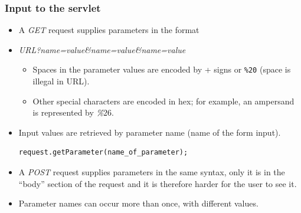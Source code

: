 \documentclass[10pt,xcolor=pdflatex]{beamer}
\begin{document}
\begin{frame}[containsverbatim]\frametitle{Input to the servlet}
\begin{itemize}
	\item A \emph{GET} request supplies parameters in the format
    \item[] \begin{footnotesize} \emph{URL?name=value\&name=value\&name=value} \end{footnotesize}
      \begin{itemize}
		\item Spaces in the parameter values are encoded by + signs or \texttt{\%20} (space is illegal in URL).
		\item Other special characters are encoded in hex; for example, an ampersand is represented by \emph{\%\texttt{$26$}}.
      \end{itemize}
    \item Input values are retrieved by parameter name (name of the form input). \begin{verbatim} 
request.getParameter(name_of_parameter);
\end{verbatim} 
	\item A \emph{POST} request supplies parameters in the same syntax, only it is in the “body” section of the request and it is therefore harder for the user to see it.
	\item Parameter names can occur more than once, with different values.
\end{itemize}
\end{frame}
\end{document}
